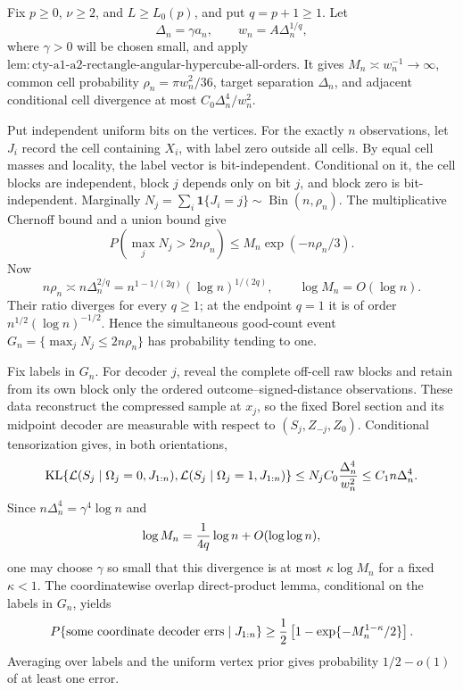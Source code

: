 Fix \(p\geq0\), \(\nu\geq2\), and \(L\geq L_0(p)\), and put \(q=p+1\geq1\).  Let
\[
 \Delta_n=\gamma a_n,
 \qquad w_n=A\Delta_n^{1/q},
\]
where \(\gamma>0\) will be chosen small, and apply \(\mathrm{lem:cty\text{-}a1\text{-}a2\text{-}rectangle\text{-}angular\text{-}hypercube\text{-}all\text{-}orders}\).  It gives \(M_n\asymp w_n^{-1}\to\infty\), common cell probability \(\rho_n=\pi w_n^2/36\), target separation \(\Delta_n\), and adjacent conditional cell divergence at most \(C_0\Delta_n^4/w_n^2\).

Put independent uniform bits on the vertices.  For the exactly \(n\) observations, let \(J_i\) record the cell containing \(X_i\), with label zero outside all cells.  By equal cell masses and locality, the label vector is bit-independent.  Conditional on it, the cell blocks are independent, block \(j\) depends only on bit \(j\), and block zero is bit-independent.  Marginally \(N_j=\sum_i\mathbf1\{J_i=j\}\sim\operatorname{Bin}(n,\rho_n)\).  The multiplicative Chernoff bound and a union bound give
\[
 P\!\left(\max_jN_j>2n\rho_n\right)
 \leq M_n\exp(-n\rho_n/3).
\]
Now
\[
 n\rho_n\asymp n\Delta_n^{2/q}
 =n^{1-1/(2q)}(\log n)^{1/(2q)},
 \qquad \log M_n=O(\log n).
\]
Their ratio diverges for every \(q\geq1\); at the endpoint \(q=1\) it is of order \(n^{1/2}(\log n)^{-1/2}\).  Hence the simultaneous good-count event \(G_n=\{\max_jN_j\leq2n\rho_n\}\) has probability tending to one.

Fix labels in \(G_n\).  For decoder \(j\), reveal the complete off-cell raw blocks and retain from its own block only the ordered outcome--signed-distance observations.  These data reconstruct the compressed sample at \(x_j\), so the fixed Borel section and its midpoint decoder are measurable with respect to \((S_j,Z_{-j},Z_0)\).  Conditional tensorization gives, in both orientations,
\[
 \operatorname{KL}\{\mathcal L(S_j\mid\Omega_j=0,J_{1:n}),
 \mathcal L(S_j\mid\Omega_j=1,J_{1:n})\}
 \leq N_jC_0{\Delta_n^4\over w_n^2}
 \leq C_1n\Delta_n^4.
\]
Since \(n\Delta_n^4=\gamma^4\log n\) and
\[
 \log M_n={1\over4q}\log n+O(\log\log n),
\]
one may choose \(\gamma\) so small that this divergence is at most \(\kappa\log M_n\) for a fixed \(\kappa<1\).  The coordinatewise overlap direct-product lemma, conditional on the labels in \(G_n\), yields
\[
 P\{\text{some coordinate decoder errs}\mid J_{1:n}\}
 \geq {1\over2}\left[1-\exp\{-M_n^{1-\kappa}/2\}\right].
\]
Averaging over labels and the uniform vertex prior gives probability \(1/2-o(1)\) of at least one error.

